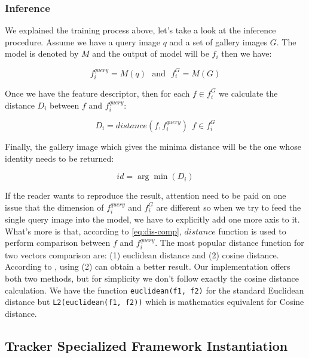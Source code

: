 \subsubsection{Inference}
\label{fw-recognizer-spec-inference}

We explained the training process above, let's take a look at the inference
procedure. Assume we have a query image $q$ and a set of gallery images $G$.
The model is denoted by $M$ and the output of model will be $f_i$ then we have:

$$
f_i^{query} = M(q) \:\:\: \text{and} \:\:\: f_i^{G} = M(G)
$$

Once we have the feature descriptor, then for each $f \in f_i^G$  we calculate
the distance $D_i$ between $f$ and $f_i^{query}$:

\begin{equation}
\label{eq:dis-comp}
D_i =  distance(f, f_i^{query}) \:\: f \in f_i^G
\end{equation}

Finally, the gallery image which gives the minima distance will be the one
whose identity needs to be returned:

$$
id = \arg \min(D_i)
$$

If the reader wants to reproduce the result, attention need to be paid on one issue
that the dimension of $f_i^{query}$ and $f_i^G$ are different so when we try
to feed the single query image into the model, we have to explicitly add one
more axis to it.
What's more is that, according to \autoref{eq:dis-comp},  $distance$ function is
used to perform comparison between $f$ and $f_i^{query}$. The most popular
distance function for two vectors comparison are: (1) euclidean distance and (2)
cosine distance. According to \cite{tricks-and-baseline-for-reid-2019}, using
(2) can obtain a better result. Our implementation offers both two
methods, but for simplicity we don't follow exactly the cosine distance
calculation. We have the function \texttt{euclidean(f1, f2)} for the standard
Euclidean distance but \texttt{L2(euclidean(f1, f2))} which is
mathematics equivalent for Cosine distance.

\subsection{Tracker Specialized Framework Instantiation}
\label{sec:fw-inst-tracker}

